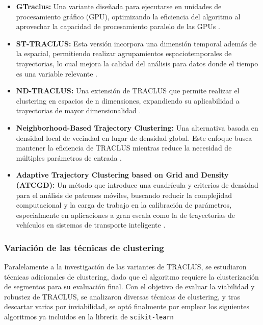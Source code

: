 \begin{itemize}
    \item \textbf{GTraclus:} Una variante diseñada para ejecutarse en unidades de procesamiento gráfico (GPU), optimizando la eficiencia del algoritmo al aprovechar la capacidad de procesamiento paralelo de las GPUs \cite{gtraclus}.

    \item \textbf{ST-TRACLUS:} Esta versión incorpora una dimensión temporal además de la espacial, permitiendo realizar agrupamientos espaciotemporales de trayectorias, lo cual mejora la calidad del análisis para datos donde el tiempo es una variable relevante \cite{st-traclus}.

    \item \textbf{ND-TRACLUS:} Una extensión de TRACLUS que permite realizar el clustering en espacios de n dimensiones, expandiendo su aplicabilidad a trayectorias de mayor dimensionalidad \cite{nd-traclus}.

    \item \textbf{Neighborhood-Based Trajectory Clustering:} Una alternativa basada en densidad local de vecindad en lugar de densidad global. Este enfoque busca mantener la eficiencia de TRACLUS mientras reduce la necesidad de múltiples parámetros de entrada \cite{nb-traclus}.

    \item \textbf{Adaptive Trajectory Clustering based on Grid and Density (ATCGD):} Un método que introduce una cuadrícula y criterios de densidad para el análisis de patrones móviles, buscando reducir la complejidad computacional y la carga de trabajo en la calibración de parámetros, especialmente en aplicaciones a gran escala como la de trayectorias de vehículos en sistemas de transporte inteligente \cite{atcgd}.
\end{itemize}

\subsubsection{Variación de las técnicas de clustering}

Paralelamente a la investigación de las variantes de TRACLUS, se estudiaron técnicas adicionales de clustering, dado que el algoritmo requiere la clusterización de segmentos para su evaluación final. Con el objetivo de evaluar la viabilidad y robustez de TRACLUS, se analizaron diversas técnicas de clustering, y tras descartar varias por inviabilidad, se optó finalmente por emplear los siguientes algoritmos ya incluidos en la librería de \texttt{scikit-learn} \cite{sklearn_cluster}

